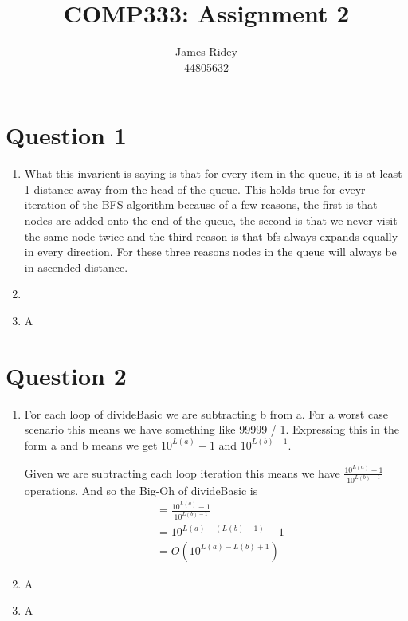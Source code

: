 \documentclass[journal,a4paper]{IEEEtran}
\begin{document}
\onecolumn

\title{COMP333: Assignment 2}
\author{James Ridey\\
44805632}
\maketitle



\lstset{escapechar=@,style=customc}

\section*{Question 1}
\begin{enumerate}
	\item What this invarient is saying is that for every item in the queue, it is at least 1 distance away from the head of the queue. This holds true for eveyr iteration of the BFS algorithm because of a few reasons, the first is that nodes are added onto the end of the queue, the second is that we never visit the same node twice and the third reason is that bfs always expands equally in every direction. For these three reasons nodes in the queue will always be in ascended distance.
	\item 
	\item A
\end{enumerate}

\section*{Question 2}
\begin{enumerate}
	\item For each loop of divideBasic we are subtracting b from a. For a worst case scenario this means we have something like 99999 / 1. Expressing this in the form a and b means we get $10^{L(a)}-1$ and $10^{L(b)-1}$. 

Given we are subtracting each loop iteration this means we have $\frac{10^{L(a)}-1}{10^{L(b)-1}}$ operations. And so the Big-Oh of divideBasic is 
	\begin{align*}
		&= \frac{10^{L(a)}-1}{10^{L(b)-1}} \\
		&= 10^{L(a)-(L(b)-1)} - 1 \\
		&= O(10^{L(a)-L(b)+1})
	\end{align*}
	\item A
	\item A
\end{enumerate}
\end{document}
